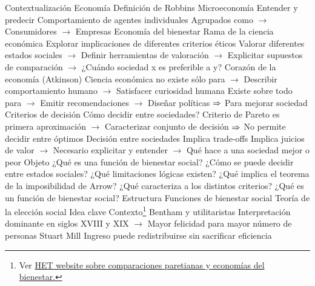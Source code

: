\documentclass{nuevotema}
\begin{document}
\esquemalargo


















\begin{esquemal}
	\1[] 
		\2 Contextualización
			\3 Economía
				\4 Definición de Robbins
				\4 Microeconomía
				\4[] Entender y predecir
				\4[] Comportamiento de agentes individuales
				\4[] Agrupados como
				\4[] $\to$ Consumidores
				\4[] $\to$ Empresas
			\3 Economía del bienestar
				\4 Rama de la ciencia económica
				\4[] Explorar implicaciones de diferentes criterios éticos
				\4 Valorar diferentes estados sociales
				\4[] $\to$ Definir herramientas de valoración
				\4[] $\to$ Explicitar supuestos de comparación
				\4[] $\to$ ¿Cuándo sociedad x es preferible a y?
				\4 Corazón de la economía (Atkinson)
				\4[] Ciencia económica no existe sólo para
				\4[] $\to$ Describir comportamiento humano
				\4[] $\to$ Satisfacer curiosidad humana
				\4[] Existe sobre todo para
				\4[] $\to$ Emitir recomendaciones
				\4[] $\to$ Diseñar políticas
				\4[] $\Rightarrow$ Para mejorar sociedad
			\3 Criterios de decisión
				\4 Cómo decidir entre sociedades?
				\4[] Criterio de Pareto es primera aproximación
				\4[] $\to$ Caracterizar conjunto de decisión
				\4[] $\Rightarrow$ No permite decidir entre óptimos
				\4 Decisión entre sociedades
				\4[] Implica trade-offs
				\4[] Implica juicios de valor
				\4[] $\to$ Necesario explicitar y entender
				\4[] $\to$ Qué hace a una sociedad mejor o peor
		\2 Objeto
			\3 ¿Qué es una función de bienestar social?
			\3 ¿Cómo se puede decidir entre estados sociales?
			\3 ¿Qué limitaciones lógicas existen?
			\3 ¿Qué implica el teorema de la imposibilidad de Arrow?
			\3 ¿Qué caracteriza a los distintos criterios?
			\3 ¿Qué es un función de bienestar social?
		\2 Estructura
			\3 Funciones de bienestar social
			\3 Teoría de la elección social
	\1 
		\2 Idea clave
			\3 Contexto\footnote{Ver \href{https://www.hetwebsite.net/het/essays/paretian/paretosocial.htm}{HET website sobre comparaciones paretianas y economías del bienestar.}}
				\4 Bentham y utilitaristas
				\4[] Interpretación dominante en siglos XVIII y XIX
				\4[] $\to$ Mayor felicidad para mayor número de personas
				\4 Stuart Mill
				\4[] Ingreso puede redistribuirse sin sacrificar eficiencia

\end{esquemal}
\end{document}
